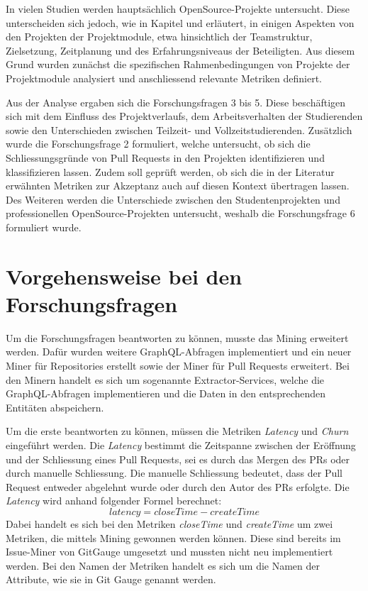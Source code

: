 In vielen Studien werden hauptsächlich OpenSource-Projekte untersucht. Diese unterscheiden sich jedoch, wie in Kapitel  und  erläutert, in einigen Aspekten von den Projekten der Projektmodule, etwa hinsichtlich der Teamstruktur, Zielsetzung, Zeitplanung und des Erfahrungsniveaus der Beteiligten.
Aus diesem Grund wurden zunächst die spezifischen Rahmenbedingungen von Projekte der Projektmodule analysiert und anschliessend relevante Metriken definiert.

Aus der Analyse ergaben sich die Forschungsfragen 3 bis 5. Diese beschäftigen sich mit dem Einfluss des Projektverlaufs, dem Arbeitsverhalten der Studierenden sowie den Unterschieden zwischen Teilzeit- und Vollzeitstudierenden. Zusätzlich wurde die Forschungsfrage 2 formuliert, welche untersucht, ob sich die Schliessungsgründe von Pull Requests in den Projekten identifizieren und klassifizieren lassen. Zudem soll geprüft werden, ob sich die in der Literatur erwähnten Metriken zur Akzeptanz auch auf diesen Kontext übertragen lassen. Des Weiteren werden die Unterschiede zwischen den Studentenprojekten und professionellen OpenSource-Projekten untersucht, weshalb die Forschungsfrage 6 formuliert wurde. 

\section{Vorgehensweise bei den Forschungsfragen}
\label{sec:AnalyseChurnvsLatency}
\label{sec:Metriken}
Um die Forschungsfragen beantworten zu können, musste das Mining erweitert werden. Dafür wurden weitere GraphQL-Abfragen implementiert und ein neuer  Miner für Repositories erstellt sowie der Miner für Pull Requests erweitert. Bei den Minern handelt es sich um sogenannte Extractor-Services, welche die GraphQL-Abfragen implementieren und die Daten in den entsprechenden Entitäten abspeichern.

Um die erste  beantworten zu können, müssen die Metriken \textit{Latency} und \textit{Churn} eingeführt werden. Die \textit{Latency} bestimmt die Zeitspanne zwischen der Eröffnung und der Schliessung eines Pull Requests, sei es durch das Mergen des PRs oder durch manuelle Schliessung. Die manuelle Schliessung bedeutet, dass der Pull Request entweder abgelehnt wurde oder durch den Autor des PRs erfolgte. Die \textit{Latency} wird anhand folgender Formel berechnet:
\begin{equation}
latency = closeTime - createTime
\end{equation}
Dabei handelt es sich bei den Metriken \textit{closeTime} und \textit{createTime} um zwei Metriken, die mittels Mining gewonnen werden können. Diese sind bereits im Issue-Miner von GitGauge umgesetzt und mussten nicht neu implementiert werden. Bei den Namen der Metriken handelt es sich um die Namen der Attribute, wie sie in Git Gauge genannt werden.

